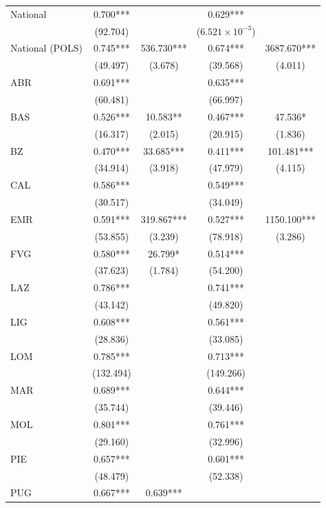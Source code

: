 \documentclass[12pt]{article}
\begin{document}
\begin{appendices}
\begin{longtable}{@{}lcccc@{}}
            National & 0.700*** &  & 0.629*** &  \\ 
             & (92.704) &  & ($6.521 \times 10^{-3}$) & \\
            National (POLS) & 0.745*** & 536.730*** & 0.674*** & 3687.670***\\ 
             & (49.497) & (3.678) & (39.568) & (4.011) \\ 
            ABR & 0.691*** &  & 0.635*** &  \\ 
             & (60.481) &  & (66.997) &  \\ 
            BAS & 0.526*** & 10.583** & 0.467*** & 47.536* \\ 
             & (16.317) & (2.015) & (20.915) & (1.836) \\ 
            BZ & 0.470*** & 33.685*** & 0.411*** & 101.481*** \\ 
             & (34.914) & (3.918) & (47.979) & (4.115) \\ 
            CAL & 0.586*** &  & 0.549*** &  \\ 
             & (30.517) &  & (34.049) &  \\ 
            EMR & 0.591*** & 319.867*** & 0.527*** & 1150.100*** \\ 
             & (53.855) & (3.239) & (78.918) & (3.286) \\ 
            FVG & 0.580*** & 26.799* & 0.514*** &  \\ 
             & (37.623) & (1.784) & (54.200) &  \\ 
            LAZ & 0.786*** &  & 0.741*** &  \\ 
             & (43.142) &  & (49.820) &  \\ 
            LIG & 0.608*** &  & 0.561*** &  \\ 
             & (28.836) &  & (33.085) &  \\ 
            LOM & 0.785*** &  & 0.713*** &  \\ 
             & (132.494) &  & (149.266) &  \\ 
            MAR & 0.689*** &  & 0.644*** &  \\ 
             & (35.744) &  & (39.446) &  \\ 
            MOL & 0.801*** &  & 0.761*** &  \\ 
             & (29.160) &  & (32.996) &  \\ 
            PIE & 0.657*** &  & 0.601*** &  \\ 
             & (48.479) &  & (52.338) &  \\ 
            PUG & 0.667*** &  0.639*** &  \\ 

\end{longtable}
\end{appendices}
\end{document}
